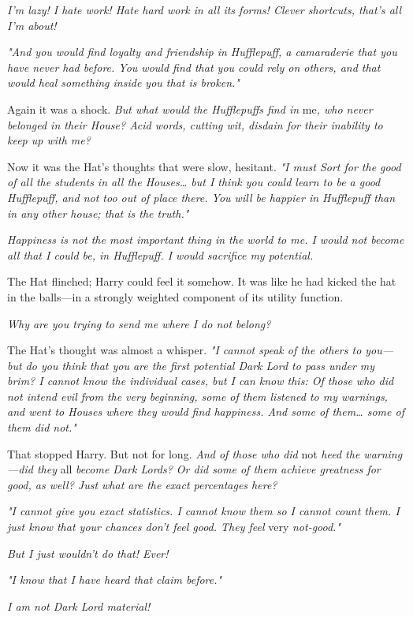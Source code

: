 \emph{I'm lazy! I hate work! Hate hard work in all its forms! Clever shortcuts, that's all I'm about!}

\emph{"And you would find loyalty and friendship in Hufflepuff, a camaraderie that you have never had before. You would find that you could rely on others, and that would heal something inside you that is broken."}

Again it was a shock. \emph{But what would the Hufflepuffs find in} me\emph{, who never belonged in their House? Acid words, cutting wit, disdain for their inability to keep up with me?}

Now it was the Hat's thoughts that were slow, hesitant. \emph{"I must Sort for the good of all the students in all the Houses{\ldots} but I think you could learn to be a good Hufflepuff, and not too out of place there. You will be happier in Hufflepuff than in any other house; that is the truth."}

\emph{Happiness is not the most important thing in the world to me. I would not become all that I could be, in Hufflepuff. I would sacrifice my potential.}

The Hat flinched; Harry could feel it somehow. It was like he had kicked the hat in the balls---in a strongly weighted component of its utility function.

\emph{Why are you trying to send me where I do not belong?}

The Hat's thought was almost a whisper. \emph{"I cannot speak of the others to you---but do you think that you are the first potential Dark Lord to pass under my brim? I cannot know the individual cases, but I can know this: Of those who did not intend evil from the very beginning, some of them listened to my warnings, and went to Houses where they would find happiness. And some of them{\ldots} some of them did not."}

That stopped Harry. But not for long. \emph{And of those who did} not\emph{ heed the warning---did they} all\emph{ become Dark Lords? Or did some of them achieve greatness for good, as well? Just what are the exact percentages here?}

\emph{"I cannot give you exact statistics. I cannot know them so I cannot count them. I just know that your chances don't feel good. They feel} very\emph{ not-good."}

\emph{But I just wouldn't do that! Ever!}

\emph{"I know that I have heard that claim before."}

\emph{I am not Dark Lord material!}

